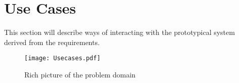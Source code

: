 \section{Use Cases}\label{sub:usecases}

This section will describe ways of interacting with the prototypical system derived from the requirements.

\begin{figure}
  \centering
  \begin{adjustbox}{max width=\textwidth}
    \texttt{[image: Usecases.pdf]}
  \end{adjustbox}
  \caption{Rich picture of the problem domain}
\end{figure}
